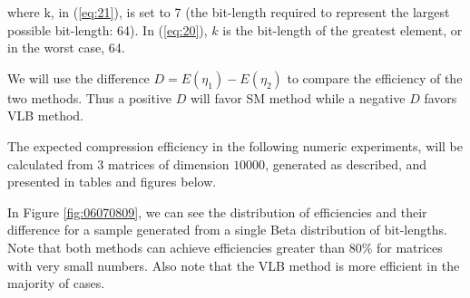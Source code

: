 \documentclass[10pt]{article}
\begin{document}
\noindent where k, in (\ref{eq:21}), is set to 7 (the bit-length required to represent the largest possible bit-length: 64). In (\ref{eq:20}), $k$ is the bit-length of the greatest element, or in the worst case, 64.

We will use the difference $D=E(\eta_1)-E(\eta_2)$ to compare the efficiency of the two methods. Thus a positive $D$ will favor SM method while a negative $D$ favors VLB method.

The expected compression efficiency in the following numeric experiments, will be calculated from $3$ matrices of dimension $10000$, generated as described, and presented in tables and figures below. 
 
In Figure \ref{fig:06070809}, we can see the distribution of efficiencies and their difference for a sample generated from a single Beta distribution of bit-lengths. Note that both methods can achieve efficiencies greater than 80\% for matrices with very small numbers. Also note that the VLB method is more efficient in the majority of cases.
 
\end{document}
